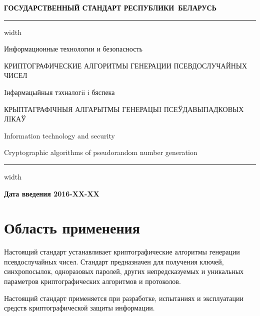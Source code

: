 \newpage
\setcounter{page}{1}
\pagestyle{headings}

\begin{center}
{\bfseries
ГОСУДАРСТВЕННЫЙ СТАНДАРТ РЕСПУБЛИКИ~БЕЛАРУСЬ
\vskip 2pt
\hrule width\textwidth

\vskip 9pt

Информационные технологии и безопасность

КРИПТОГРАФИЧЕСКИЕ АЛГОРИТМЫ ГЕНЕРАЦИИ ПСЕВДОСЛУЧАЙНЫХ ЧИСЕЛ

\vskip 9pt

Iнфармацыйныя тэхналогii i бяспека

КРЫПТАГРАФIЧНЫЯ АЛГАРЫТМЫ ГЕНЕРАЦЫI ПСЕЎДАВЫПАДКОВЫХ ЛIКАЎ
} %

\vskip 9pt

Information technology and security

Cryptographic algorithms of pseudorandom number generation

\vskip 4pt                
\hrule width \textwidth
\end{center}

\mbox{}\hfill{\bfseries Дата введения 2016-XX-XX}


\chapter{Область применения}

Настоящий стандарт устанавливает криптографические алгоритмы генерации 
псевдослучайных чисел. Стандарт предназначен для получения
ключей, синхропосылок, одноразовых паролей,
других непредсказуемых и уникальных параметров 
криптографических алгоритмов и протоколов.

Настоящий стандарт применяется при разработке, испытаниях и эксплуатации 
средств криптографической защиты информации.


